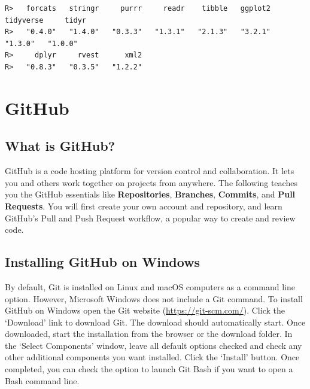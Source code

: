 \documentclass[
]{book}
\newenvironment{Shaded}{\begin{snugshade}}{\end{snugshade}}
\newcommand{\KeywordTok}[1]{\textcolor[rgb]{0.13,0.29,0.53}{\textbf{#1}}}
\newcommand{\NormalTok}[1]{#1}
\newcommand{\OperatorTok}[1]{\textcolor[rgb]{0.81,0.36,0.00}{\textbf{#1}}}
\newcommand{\StringTok}[1]{\textcolor[rgb]{0.31,0.60,0.02}{#1}}
\begin{document}
\begin{Shaded}
\end{Shaded}

\begin{verbatim}
R>   forcats   stringr     purrr     readr    tibble   ggplot2 tidyverse     tidyr 
R>   "0.4.0"   "1.4.0"   "0.3.3"   "1.3.1"   "2.1.3"   "3.2.1"   "1.3.0"   "1.0.0" 
R>     dplyr     rvest      xml2 
R>   "0.8.3"   "0.3.5"   "1.2.2"
\end{verbatim}

\hypertarget{github}{%
\chapter{GitHub}\label{github}}

\hypertarget{what-is-github}{%
\section{What is GitHub?}\label{what-is-github}}

GitHub is a code hosting platform for version control and collaboration. It lets you and others work together on projects from anywhere. The following teaches you the GitHub essentials like \textbf{Repositories}, \textbf{Branches}, \textbf{Commits}, and \textbf{Pull Requests}. You will first create your own account and repository, and learn GitHub's Pull and Push Request workflow, a popular way to create and review code.

\hypertarget{installing-github-on-windows}{%
\section{Installing GitHub on Windows}\label{installing-github-on-windows}}

By default, Git is installed on Linux and macOS computers as a command line option. However, Microsoft Windows does not include a Git command. To install GitHub on Windows open the Git website (\url{https://git-scm.com/}). Click the `Download' link to download Git. The download should automatically start. Once downloaded, start the installation from the browser or the download folder. In the `Select Components' window, leave all default options checked and check any other additional components you want installed. Click the `Install' button. Once completed, you can check the option to launch Git Bash if you want to open a Bash command line.
\end{document}
